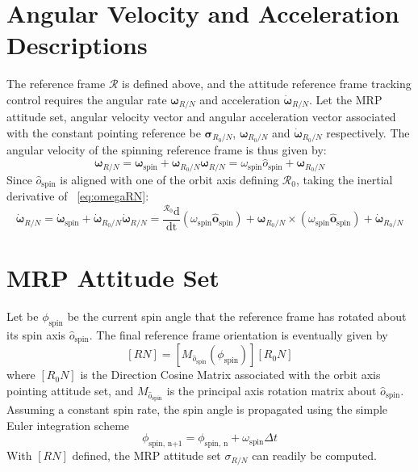 \documentclass[]{AVSSimReportMemo}
\begin{document}
\section{Angular Velocity and Acceleration Descriptions}
The reference frame $\mathcal{R}$ is defined above, and the attitude reference frame tracking control requires the angular rate $\bm\omega_{R/N}$ and acceleration $\dot{\bm\omega}_{R/N}$. 
Let the MRP attitude set, angular velocity vector and angular acceleration vector associated with the constant pointing reference be $\bm\sigma_{
R_{0}/N}$, $\bm\omega_{R_{0}/N}$ and $\bm\dot{\omega}_{R_{0}/N}$ respectively.
The angular velocity of the spinning reference frame is thus given by:
\begin{subequations}
	\label{eq:omegaRN}
	\begin{equation}
		\bm\omega_{R/N} = \bm\omega_{\textrm{spin}} + \bm\omega_{R_{0}/N} 
	\end{equation}
	\begin{equation}
		\bm\omega_{R/N} = {\omega}_{\textrm{spin}}\hat{o}_{\textrm{spin}} + \bm\omega_{R_{0}/N}
	\end{equation}
\end{subequations}
Since $\hat {o}_{\textrm{spin}}$ is aligned with one of the orbit axis defining $\mathcal{R}_{0}$, taking the inertial derivative of ~\eqref{eq:omegaRN}:
\begin{subequations}
	\label{eq:domegaRN}
	\begin{equation}
		\dot{\bm\omega}_{R/N} = \dot{\bm\omega}_{\textrm{spin}} +\dot{\bm\omega}_{R_{0}/N} 
	\end{equation}
	\begin{equation}
		\dot{\bm\omega}_{R/N} = \frac{^{\mathcal{R}_{0}} \textrm{d}}{\textrm{dt}} (\omega_{\textrm{spin}}\bm\hat{o}_{\textrm{spin}}) + \bm\omega_{R_{0}/N}\times (\omega_{\textrm{spin}}\bm\hat{o}_{\textrm{spin}}) + \bm{\dot\omega}_{R_{0}/N}
	\end{equation}
\end{subequations}
\section{MRP Attitude Set}
Let be $\phi_{\textrm{spin}}$ be the current spin angle that the reference frame has rotated about its spin axis $\hat o_{\textrm{spin}}$. The final reference frame orientation is eventually given by
\begin{equation}
	\label{eq:dbeta}
	[RN] =  [M_{\hat{o}_{\textrm{spin}}} (\phi_{\textrm{spin}})][R_{0}N]
\end{equation}
where $[R_{0}N]$ is the Direction Cosine Matrix associated with the orbit axis pointing attitude set, and $M_{\hat{o}_{\textrm{spin}}}$ is the principal axis rotation matrix about $\hat o_{\textrm{spin}}$. Assuming a constant spin rate, the spin angle is propagated using the simple Euler integration scheme
\begin{equation}
	\label{eq:dbeta}
	\phi_{\textrm{spin, n+1}} = \phi_{\textrm{spin, n}} + \omega_{\textrm{spin}}\Delta t
\end{equation}
With $[RN]$ defined, the MRP attitude set $\sigma_{R/N}$ can readily be computed.
\end{document}
